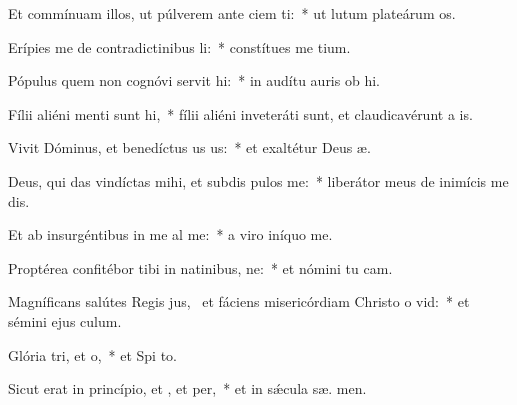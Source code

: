 \item Et commínuam illos, ut púlverem ante ciem ti:~* ut lutum plateárum  os.
\item Erípies me de contradictinibus li:~* constítues me   tium.
\item Pópulus quem non cognóvi servit hi:~* in audítu auris ob hi.
\item Fílii aliéni menti sunt hi,~* fílii aliéni inveteráti sunt, et claudicavérunt a  is.
\item Vivit Dóminus, et benedíctus us us:~* et exaltétur Deus  æ.
\item Deus, qui das vindíctas mihi, et subdis pulos  me:~* liberátor meus de inimícis me dis.
\item Et ab insurgéntibus in me al me:~* a viro iníquo  me.
\item Proptérea confitébor tibi in natinibus, ne:~* et nómini tu  cam.
\item Magníficans salútes Regis jus,~\pscross{} et fáciens misericórdiam Christo o vid:~* et sémini ejus   culum.
\item Glória tri, et o,~* et Spi to.
\item Sicut erat in princípio, et , et per,~* et in sǽcula sæ. men.
